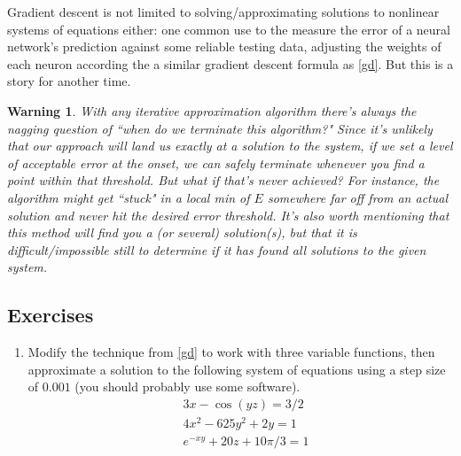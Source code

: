 \documentclass[12pt]{article}
\numberwithin{equation}{subsection}
\numberwithin{figure}{subsection}
\theoremstyle{note}
\newtheorem{warning}[subsection]{Warning}
\begin{document}
{Gradient descent is not limited to solving/approximating solutions to nonlinear systems of equations either: one common use to the measure the error of a neural network's prediction against some reliable testing data, adjusting the weights of each neuron according the a similar gradient descent formula as \eqref{gd}. But this is a story for another time.

\begin{warning}With any iterative approximation algorithm there's always the nagging question of ``when do we terminate this algorithm?" Since it's unlikely that our approach will land us \textit{exactly} at a solution to the system, if we set a level of acceptable error at the onset, we can safely terminate whenever you find a point within that threshold. But what if that's never achieved? For instance, the algorithm might get ``stuck" in a local min of $E$ somewhere far off from an actual solution and never hit the desired error threshold. It's also worth mentioning that this method will find you \textit{a} (or several) solution(s), but that it is difficult/impossible still to determine if it has found \textit{all} solutions to the given system.\end{warning}

\subsection{Exercises}
\begin{enumerate}[label=\arabic*.]

\item Modify the technique from \eqref{gd} to work with three variable functions, then approximate a solution to the following system of equations using a step size of $0.001$ (you should probably use some software).  \begin{align*}
	&3x-\cos(yz)=3/2 \\
	&4x^2-625y^2 +2y=1\\
	&e^{-xy}+20z+10\pi/3=1
\end{align*}


\end{enumerate}}
\end{document}
